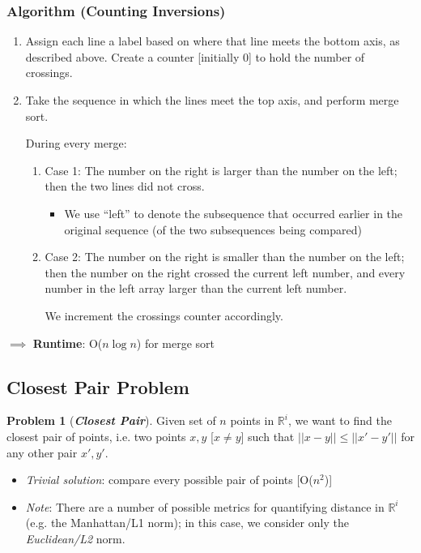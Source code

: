 \documentclass[12pt]{extarticle}
\theoremstyle{definition}
\newtheorem*{problem}{Problem}
\theoremstyle{remark}
\newcommand{\probname}[1]{\noindent \textbf{\textit{#1}}}
\begin{document}
\subsubsection*{Algorithm (Counting Inversions)}
\begin{enumerate}
    \item Assign each line a label based on where that line meets the bottom axis, as described above. Create a counter [initially 0] to hold the number of crossings.
    \item Take the sequence in which the lines meet the top axis, and perform merge sort.

    During every merge: \begin{enumerate}
        \item Case 1: The number on the right is larger than the number on the left; then the two lines did not cross.\begin{itemize}
            \item We use ``left'' to denote the subsequence that occurred earlier in the original sequence (of the two subsequences being compared)
        \end{itemize}
        \item Case 2: The number on the right is smaller than the number on the left; then the number on the right crossed the current left number, and every number in the left array larger than the current left number.

        We increment the crossings counter accordingly.
    \end{enumerate}
\end{enumerate}

$\implies$ \textbf{Runtime}: O($n\log n$) for merge sort

\pagebreak
\subsection{Closest Pair Problem}
\begin{problem}[\probname{Closest Pair}]
    Given set of $n$ points in $\mathbb{R}^i$, we want to find the closest pair of points, i.e. two points $x,y$ [$x\neq y$] such that $||x-y||\leq ||x'-y'||$ for any other pair $x',y'$. \begin{itemize}
        \item \textit{Trivial solution}: compare every possible pair of points [O($n^2$)]
        \item \textit{Note}: There are a number of possible metrics for quantifying distance in $\mathbb{R}^i$ (e.g. the Manhattan/L1 norm); in this case, we consider only the \textit{Euclidean/L2} norm.
    \end{itemize}
\end{problem}
\end{document}
